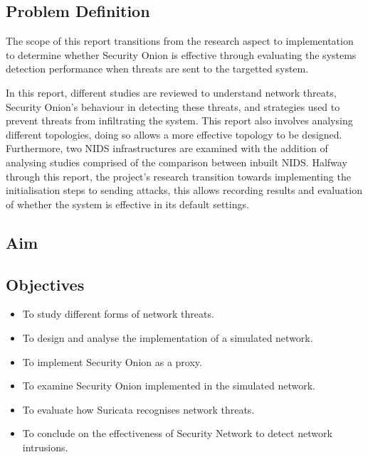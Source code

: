 \documentclass[12pt]{article}
\begin{document}
	\subsection{Problem Definition}
	The scope of this report transitions from the research aspect to implementation to determine whether Security Onion is effective through evaluating the systems detection performance when threats are sent to the targetted system. 
	
	In this report, different studies are reviewed to understand network threats, Security Onion's behaviour in detecting these threats, and strategies used to prevent threats from infiltrating the system. This report also involves analysing different topologies, doing so allows a more effective topology to be designed. Furthermore, two NIDS infrastructures are examined with the addition of analysing studies comprised of the comparison between inbuilt NIDS. Halfway through this report, the project's research transition towards implementing the initialisation steps to sending attacks, this allows recording results and evaluation of whether the system is effective in its default settings.
	
	\subsection{Aim}


	\subsection{Objectives}
	
	\begin{itemize}
		\item To study different forms of network threats. 
		\item To design and analyse the implementation of a simulated network.
		\item To implement Security Onion as a proxy.
		\item To examine Security Onion implemented in the simulated network.
		\item To evaluate how Suricata recognises network threats.
		\item To conclude on the effectiveness of Security Network to detect network intrusions.
		
	\end{itemize}
	
\end{document}
